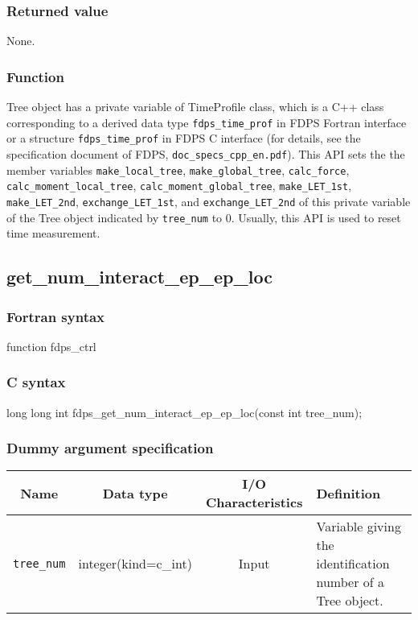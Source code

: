 \subsubsection*{Returned value}
None.

\subsubsection*{Function}
Tree object has a private variable of TimeProfile class, which is a C++ class corresponding to a derived data type \texttt{fdps\_time\_prof} in FDPS Fortran interface or a structure \texttt{fdps\_time\_prof} in FDPS C interface (for details, see the specification document of FDPS, \texttt{doc\_specs\_cpp\_en.pdf}). This API sets the the member variables \texttt{make\_local\_tree}, \texttt{make\_global\_tree}, \texttt{calc\_force}, \texttt{calc\_moment\_local\_tree}, \texttt{calc\_moment\_global\_tree}, \texttt{make\_LET\_1st}, \texttt{make\_LET\_2nd}, \texttt{exchange\_LET\_1st}, and \texttt{exchange\_LET\_2nd} of this private variable of the Tree object indicated by \texttt{tree\_num} to 0. Usually, this API is used to reset time measurement.

\clearpage

\subsection{get\_num\_interact\_ep\_ep\_loc}
\subsubsection*{Fortran syntax}
\begin{screen}
\begin{spverbatim}
function fdps_ctrl%
\end{spverbatim}
\end{screen}

\subsubsection*{C syntax}
\begin{screen}
\begin{spverbatim}
long long int fdps_get_num_interact_ep_ep_loc(const int tree_num); 
\end{spverbatim}
\end{screen}

\subsubsection*{Dummy argument specification}
\begin{table}[h]
\begin{tabularx}{\linewidth}{cccX}
\toprule
\rowcolor{Snow2}
Name & Data type & I/O Characteristics & Definition \\
\midrule
\verb|tree_num|  & integer(kind=c\_int) & Input  & Variable giving the identification number of a Tree object. \\
\bottomrule
\end{tabularx}
\end{table}

